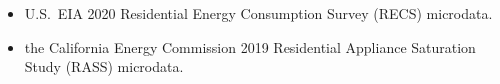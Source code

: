 \begin{itemize}
\item U.S.~EIA 2020 Residential Energy Consumption Survey (RECS) microdata.
\item the California Energy Commission 2019 Residential Appliance Saturation Study (RASS) microdata.
\end{itemize}

